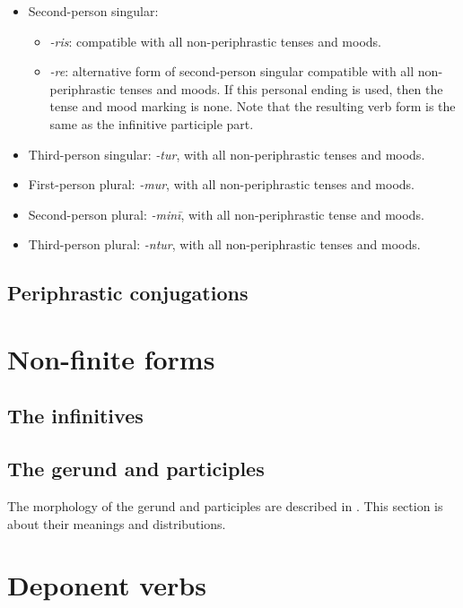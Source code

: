 \documentclass[a4paper, oneside]{report}
\newcommand{\corpus}[1]{\emph{#1}}
\begin{document}
\begin{itemize}
\begin{itemize}
        \item Second-person singular:
        \begin{itemize}
            \item \corpus{-ris}: compatible with all non-periphrastic tenses and moods.
            \item \corpus{-re}: alternative form of second-person singular compatible 
            with all non-periphrastic tenses and moods.
            If this personal ending is used, then the tense and mood marking is none.
            Note that the resulting verb form is the same as the infinitive participle part.
        \end{itemize}
        \item Third-person singular: \corpus{-tur}, with all non-periphrastic tenses and moods.
        \item First-person plural: \corpus{-mur}, with all non-periphrastic tenses and moods.
        \item Second-person plural: \corpus{-minī}, with all non-periphrastic tense and moods.
        \item Third-person plural: \corpus{-ntur}, with all non-periphrastic tenses and moods.
    \end{itemize}
\end{itemize}

\subsection{Periphrastic conjugations}

\section{Non-finite forms}

\subsection{The infinitives}\label{sec:infinitives}

\subsection{The gerund and participles}\label{sec:nominal-form}

The morphology of the gerund and participles are described in .
This section is about their meanings and distributions.

\section{Deponent verbs}\label{sec:deponent-verbs}
\end{document}
